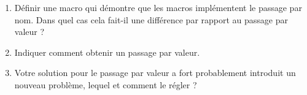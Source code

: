\begin{Exercise}[title={Macros et passage par nom}]
\label{ex:macro_appel_nom}
  \begin{enumerate}
\item Définir une macro qui démontre que les macros implémentent le
  passage par nom. Dans quel cas cela fait-il une différence par
  rapport au passage par valeur ?
\item Indiquer comment obtenir un passage par valeur.
\item Votre solution pour le passage par valeur a fort probablement
  introduit un nouveau problème, lequel et comment le régler ?
\end{enumerate}
\end{Exercise}
\begin{Answer}[ref={ex:macro_appel_nom}]
\end{Answer}
